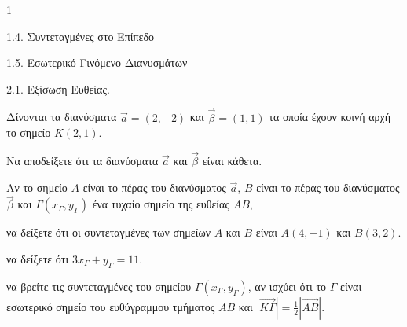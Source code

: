 \begin{ylh}{1}
    \item 1.4. Συντεταγμένες στο Επίπεδο
    \item 1.5. Εσωτερικό Γινόμενο Διανυσμάτων
    \item 2.1. Εξίσωση Ευθείας.
\end{ylh}
Δίνονται τα διανύσματα $\vec{a}=(2,-2)$ και $\vec{\beta}=(1,1)$ τα οποία έχουν κοινή αρχή το σημείο $K(2,1)$.
\begin{alist}
\item Να αποδείξετε ότι τα διανύσματα $\vec{a}$ και $\vec{\beta}$ είναι κάθετα. 
\item Αν το σημείο $A$ είναι το πέρας του διανύσματος $\vec{a}$, $B$ είναι το πέρας του διανύσματος $\vec{\beta}$ και $\Gamma(x_{\Gamma},y_{\Gamma})$ ένα τυχαίο σημείο της ευθείας $AB$,
    \begin{rlist}
    \item να δείξετε ότι οι συντεταγμένες των σημείων $A$ και $B$ είναι $A(4,-1)$ και $B(3,2)$. 
    \item να δείξετε ότι $3x_{\Gamma} + y_{\Gamma} = 11$. 
    \item να βρείτε τις συντεταγμένες του σημείου $\Gamma(x_{\Gamma},y_{\Gamma})$, αν ισχύει ότι το $\Gamma$ είναι εσωτερικό σημείο του ευθύγραμμου τμήματος $AB$ και $|\vec{K\Gamma}| = \frac{1}{2}|\vec{AB}|$. 
    \end{rlist}
\end{alist}